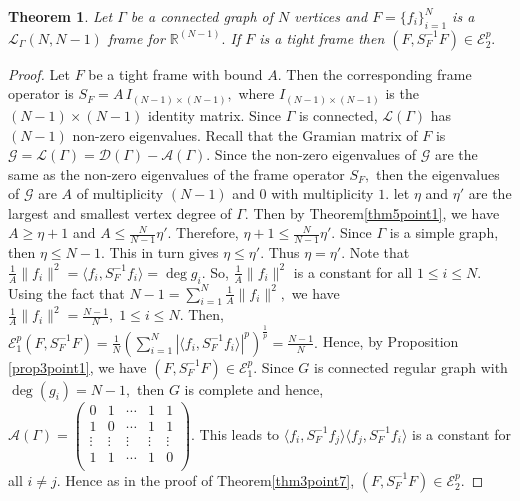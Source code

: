 \documentclass[final,1p,times]{elsarticle}
\newtheorem{thm}{Theorem}[section]
\begin{document}
\begin{thm} \label{thm5point2}
	Let $\Gamma$ be a connected graph of $N$ vertices and $F= \{f_i\}_{i=1}^N$ is a $\mathcal{L}_{\Gamma}(N,N-1)$ frame for $\mathbb{R}^{(N-1)}.$ If $F$ is a  tight frame then $\left( F, S_{F}^{-1}F \right) \in 	\mathcal{E}_{2}^p .$
\end{thm}
\begin{proof}
	Let $F$ be a tight frame with bound $A.$ Then the corresponding frame operator is $S_F = A\,I_{(N-1) \times (N-1)},$ where $I_{(N-1) \times (N-1)}$  is  the ${(N-1) \times (N-1)}$ identity matrix. Since $\Gamma$ is connected, $\mathcal{L}(\Gamma)$ has $(N-1)$ non-zero eigenvalues. Recall that the Gramian matrix of $F$ is $\mathcal{G} = \mathcal{L}(\Gamma) = \mathcal{D}(\Gamma) - \mathcal{A}(\Gamma) .$ Since the non-zero eigenvalues of $\mathcal{G} $ are the same as the non-zero eigenvalues of the frame operator $S_F,$ then the eigenvalues of $\mathcal{G} $ are $A$ of multiplicity $(N-1) $ and $0$ with multiplicity $1.$ let $\eta$ and $\eta'$ are the largest and smallest vertex degree of $\Gamma.$ Then by Theorem\ref{thm5point1}, we have $A \geq \eta + 1$ and $A \leq \frac{N}{N-1}\eta'.$ Therefore, $\eta + 1 \leq \frac{N}{N-1}\eta'.$ Since $\Gamma$ is a simple graph, then $\eta \leq N-1.$ This in turn gives $\eta \leq \eta'.$ Thus  $\eta = \eta'.$ Note that $\frac{1}{A}\|f_i\|^2 = \langle f_i, S_{F}^{-1}f_i \rangle = \deg{g_i} .$ So, $\frac{1}{A}\|f_i\|^2  $ is a constant for all $1 \leq i \leq N.$   Using the fact that $N-1 = \sum\limits_{i=1}^N \frac{1}{A}\|f_i\|^2,$ we have $\frac{1}{A}\|f_i\|^2  = \frac{N-1}{N},\;1 \leq i \leq N.$ Then,
	$\mathcal{E}_{1}^p (F,  S_{F}^{-1}F) = \frac{1}{N} \left(\sum\limits_{i=1}^N \left|  \langle f_i, S_{F}^{-1}f_i \rangle \right|^p \right)^{\frac{1}{p}} = \frac{N-1}{N}.$ Hence, by Proposition \ref{prop3point1}, we have $\left( F, S_{F}^{-1}F \right) \in \mathcal{E}_{1}^p.$ Since $G$ is connected regular graph with $\deg(g_i) = N-1,$ then $G$ is complete and hence, $\mathcal{A}(\Gamma) = \begin{pmatrix}
		0 & 1  & \cdots &1 &1\\
		1 & 0  & \cdots &1 &1 \\
		\vdots &\vdots  &\vdots &\vdots &\vdots \\
		1 & 1  & \cdots &1 &  0 \\
		
	\end{pmatrix}.$  This leads to $\langle f_i, S_{F}^{-1}f_j \rangle \langle f_j, S_{F}^{-1}f_i \rangle$ is a constant for all $ i \neq j.$ Hence as in the proof of Theorem\ref{thm3point7}, $\left( F, S_{F}^{-1}F \right) \in \mathcal{E}_{2}^p.$
\end{proof}
\end{document}
